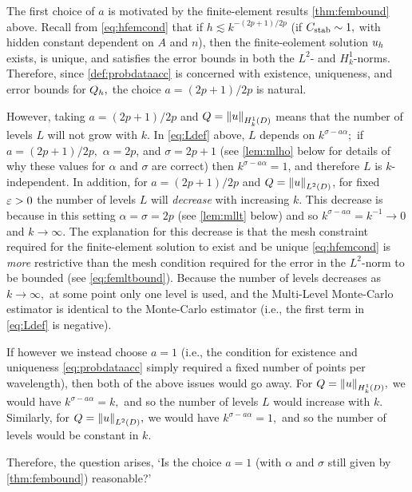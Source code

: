 The first choice of $a$ is motivated by the finite-element results \cref{thm:fembound} above. Recall from \cref{eq:hfemcond} that if $h \lesssim k^{-(2p+1)/2p}$ (if $C_{\mathrm{stab}} \sim 1,$ with hidden constant dependent on $A$ and $n$), then the finite-eolement solution $u_{h}$ exists, is unique, and satisfies the error bounds in both the $L^2$- and $H^1_k$-norms. Therefore, since \cref{def:probdataacc} is concerned with existence, uniqueness, and error bounds for $Q_{h},$ the choice $a=(2p+1)/2p$ is natural.

However, taking $a=(2p+1)/2p$ and $Q = \NHokD{u}$ means that the number of levels $L$ will not grow with $k.$ In \cref{eq:Ldef} above, $L$ depends on $k^{\sigma-a\alpha};$ if $a=(2p+1)/2p,$ $\alpha = 2p$, and $\sigma = 2p+1$ (see \cref{lem:mlho} below for details of why these values for $\alpha$ and $\sigma$ are correct) then $k^{\sigma-a\alpha} = 1$, and therefore $L$ is $k$-independent. In addition, for $a=(2p+1)/2p$ and $Q = \NLtD{u}$, for fixed $\varepsilon > 0$ the number of levels $L$ will \emph{decrease} with increasing $k.$ This decrease is because in this setting $\alpha=\sigma=2p$ (see \cref{lem:mllt} below) and so $k^{\sigma - a\alpha} = k^{-1} \rightarrow 0$ and $k \rightarrow \infty.$ The explanation for this decrease is that the mesh constraint required for the finite-element solution to exist and be unique \cref{eq:hfemcond} is \emph{more} restrictive than the mesh condition required for the error in the $L^2$-norm to be bounded (see \cref{eq:femltbound}). Because the number of levels decreases as $k \rightarrow \infty,$ at some point only one level is used, and the Multi-Level Monte-Carlo estimator is identical to the Monte-Carlo estimator (i.e., the first term in \cref{eq:Ldef} is negative).

If however we instead choose $a=1$ (i.e., the condition for existence and uniqueness \cref{eq:probdataacc} simply required a fixed number of points per wavelength), then both of the above issues would go away. For $Q = \NHokD{u},$ we would have $k^{\sigma - a\alpha} = k,$ and so the number of levels $L$ would increase with $k.$ Similarly, for $Q=  \NLtD{u},$ we would have $k^{\sigma - a\alpha} = 1,$ and so the number of levels would be constant in $k$.

Therefore, the question arises, `Is the choice $a=1$ (with $\alpha$ and $\sigma$ still given by \cref{thm:fembound}) reasonable?'

